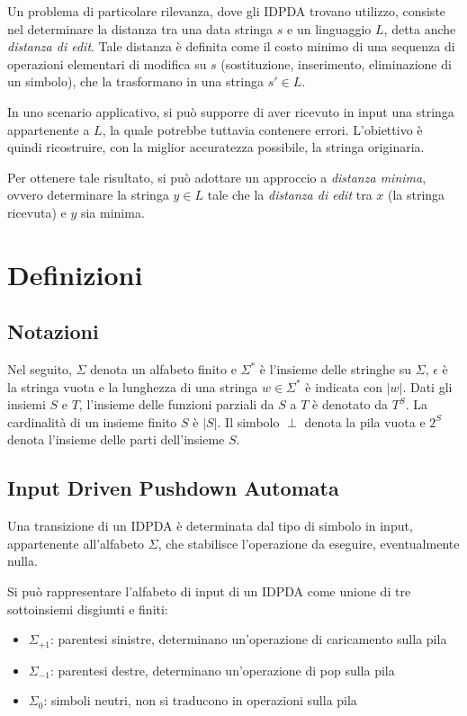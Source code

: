 \documentclass[a4paper,12pt]{report}
\theoremstyle{propositionstyle}
\begin{document}
    Un problema di particolare rilevanza, dove gli IDPDA trovano utilizzo, consiste nel determinare la distanza tra una data stringa $s$ e un linguaggio $L$, detta anche \textit{distanza di edit}.
    Tale distanza è definita come il costo minimo di una sequenza di operazioni elementari di modifica su $s$ (sostituzione, inserimento, eliminazione di un simbolo), che la trasformano in una stringa $s' \in L$.

    In uno scenario applicativo, si può supporre di aver ricevuto in input una stringa appartenente a $L$, la quale potrebbe tuttavia contenere errori.
    L'obiettivo è quindi ricostruire, con la miglior accuratezza possibile, la stringa originaria.

    Per ottenere tale risultato, si può adottare un approccio a \emph{distanza minima}, ovvero determinare la stringa $y \in L$ tale che la \textit{distanza di edit} tra $x$ (la stringa ricevuta) e $y$ sia minima.


    \chapter{Definizioni}


    \section{Notazioni}

    Nel seguito, $\Sigma$ denota un alfabeto finito e $\Sigma^*$ è l'insieme delle stringhe su $\Sigma$, $\epsilon$ è la stringa vuota e la lunghezza di una stringa $w \in \Sigma^*$ è indicata con $|w|$. Dati gli insiemi $S$ e $T$, l'insieme delle funzioni parziali da $S$ a $T$ è denotato da $T^S$. La cardinalità di un insieme finito $S$ è $|S|$. Il simbolo $\perp$ denota la pila vuota e $2^S$ denota l'insieme delle parti dell'insieme $S$.


    \section{Input Driven Pushdown Automata}

    Una transizione di un IDPDA è determinata dal tipo di simbolo in input, appartenente all'alfabeto $\Sigma$, che stabilisce l'operazione da eseguire, eventualmente nulla.

    Si può rappresentare l'alfabeto di input di un IDPDA come unione di tre sottoinsiemi disgiunti e finiti:

    \begin{itemize}
        \item $\Sigma_{+1}$: parentesi sinistre, determinano un'operazione di caricamento sulla pila
        \item $\Sigma_{-1}$: parentesi destre, determinano un'operazione di pop sulla pila
        \item $\Sigma_{0}$: simboli neutri, non si traducono in operazioni sulla pila
    \end{itemize}
\end{document}
